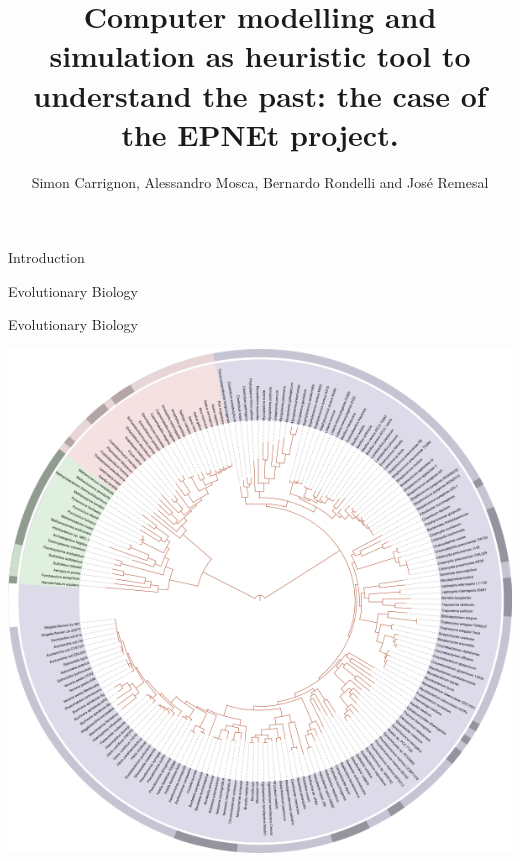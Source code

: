 \documentclass[12pt, notes=show]{beamer}
\title{Computer modelling and simulation as heuristic tool to understand the past: the case of the EPNEt project.}
\author{Simon Carrignon, Alessandro Mosca, Bernardo Rondelli and José Remesal}
\institute{19 May 2016}
\date{
	\scriptsize
	\begin{columns}
		\begin{column}{.2\textwidth}
			\begin{center}
				\texttt{[image: images/bscLogo.jpg]} \hspace{2cm}
			\end{center}
		\end{column}
		\begin{column}{.2\textwidth}
			\begin{column}{.2\textwidth}
				\begin{center}
					\texttt{[image: images/bscLogo.jpg]} \hspace{2cm}
				\end{center}
			\end{column}
			\begin{center}
				\texttt{[image: images/bscLogo.jpg]} \hspace{2cm}
			\end{center}
		\end{column}
		\begin{column}{.2\textwidth}
			\begin{center}
				\texttt{[image: images/upfLogo.jpeg]} %
			\end{center}
		\end{column}
	\end{columns}

}
\begin{document}
\begin{frame}{Introduction}
\end{frame}

\begin{frame}{Evolutionary Biology}
\end{frame}

\begin{frame}{Evolutionary Biology}
	\begin{center}
		\includegraphics[width=.9\textheight]{images/philoLife.png}
	\end{center}
\end{frame}
\end{document}
